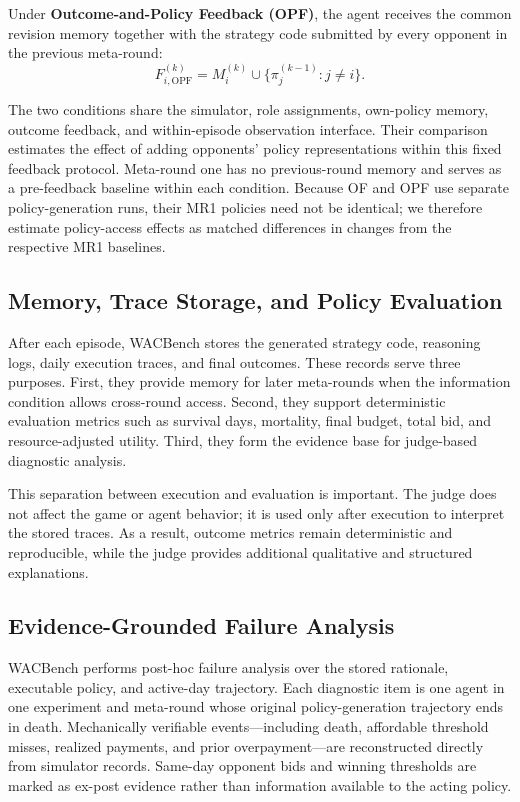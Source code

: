 \documentclass[letterpaper]{article} %
\begin{document}
Under \textbf{Outcome-and-Policy Feedback (OPF)}, the agent
receives the common revision memory together with the strategy
code submitted by every opponent in the previous meta-round:
\begin{equation}
    F_{i,\mathrm{OPF}}^{(k)}
    =
    M_i^{(k)}
    \cup
    \{\pi_j^{(k-1)}:j\neq i\}.
\end{equation}

The two conditions share the simulator, role assignments, own-policy memory,
outcome feedback, and within-episode observation interface. Their comparison
estimates the effect of adding opponents' policy representations within this
fixed feedback protocol. Meta-round one has no previous-round memory and
serves as a pre-feedback baseline within each condition. Because OF and OPF
use separate policy-generation runs, their MR1 policies need not be identical;
we therefore estimate policy-access effects as matched differences in changes
from the respective MR1 baselines.

\subsection{Memory, Trace Storage, and Policy Evaluation}

After each episode, WACBench stores the generated strategy code, reasoning logs, daily execution traces, and final outcomes. These records serve three purposes. First, they provide memory for later meta-rounds when the information condition allows cross-round access. Second, they support deterministic evaluation metrics such as survival days, mortality, final budget, total bid, and resource-adjusted utility. Third, they form the evidence base for judge-based diagnostic analysis.

This separation between execution and evaluation is important. The judge does not affect the game or agent behavior; it is used only after execution to interpret the stored traces. As a result, outcome metrics remain deterministic and reproducible, while the judge provides additional qualitative and structured explanations.

\subsection{Evidence-Grounded Failure Analysis}

WACBench performs post-hoc failure analysis over the stored rationale,
executable policy, and active-day trajectory. Each diagnostic item is one
agent in one experiment and meta-round whose original policy-generation
trajectory ends in death. Mechanically verifiable events---including death,
affordable threshold misses, realized payments, and prior overpayment---are
reconstructed directly from simulator records. Same-day opponent bids and
winning thresholds are marked as ex-post evidence rather than information
available to the acting policy.
\end{document}
